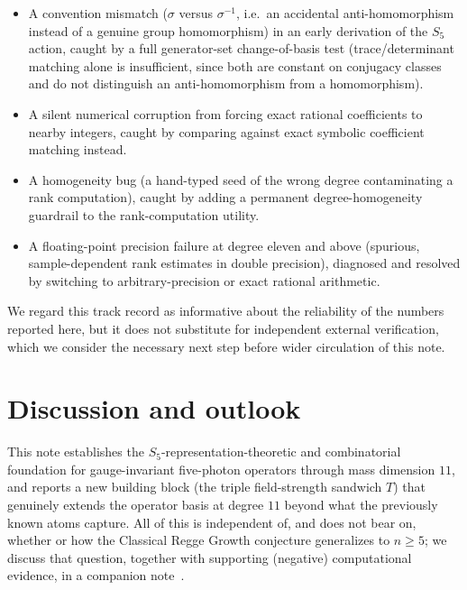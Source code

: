 \documentclass[reqno]{amsart}
\begin{document}
\begin{sloppypar}
\begin{itemize}
    \item A convention mismatch ($\sigma$ versus $\sigma^{-1}$, i.e.\ an accidental
    anti-homomorphism instead of a genuine group homomorphism) in an early derivation of the
    $S_5$ action, caught by a full generator-set change-of-basis test (trace/determinant matching
    alone is insufficient, since both are constant on conjugacy classes and do not distinguish an
    anti-homomorphism from a homomorphism).
    \item A silent numerical corruption from forcing exact rational coefficients to nearby
    integers, caught by comparing against exact symbolic coefficient matching instead.
    \item A homogeneity bug (a hand-typed seed of the wrong degree contaminating a rank
    computation), caught by adding a permanent degree-homogeneity guardrail to the
    rank-computation utility.
    \item A floating-point precision failure at degree eleven and above (spurious,
    sample-dependent rank estimates in double precision), diagnosed and resolved by switching to
    arbitrary-precision or exact rational arithmetic.
\end{itemize}
\end{sloppypar}

We regard this track record as informative about the reliability of the numbers reported here, but
it does not substitute for independent external verification, which we consider the necessary next
step before wider circulation of this note.

\section{Discussion and outlook}
\label{sec:discussion}

This note establishes the $S_5$-representation-theoretic and combinatorial foundation for
gauge-invariant five-photon operators through mass dimension $11$, and reports a new building
block (the triple field-strength sandwich $T$) that genuinely extends the operator basis at
degree $11$ beyond what the previously known atoms capture. All of this is independent of, and
does not bear on, whether or how the Classical Regge Growth conjecture generalizes to $n\geq5$; we
discuss that question, together with supporting (negative) computational evidence, in a companion
note~\cite{crgopennote}.
\end{document}
